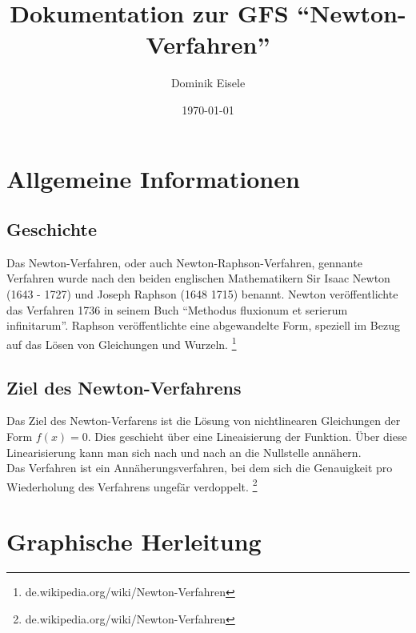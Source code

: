 \documentclass[a4paper,12pt,fleqn,oneside]{article}
\author{Dominik Eisele}
\title{Dokumentation zur GFS "`Newton-Verfahren"'}
\date{\today}
\begin{document}
\normalem

\begin{titlepage}
	\maketitle
\end{titlepage}

\tableofcontents

\newpage

\section{Allgemeine Informationen}
	\subsection{Geschichte}
		Das Newton-Verfahren, oder auch Newton-Raphson-Verfahren, gennante Verfahren wurde nach den beiden englischen Mathematikern Sir 
		Isaac Newton (1643 - 1727) und Joseph Raphson (1648 1715) benannt. Newton veröffentlichte das Verfahren 1736 in seinem Buch
		"`Methodus fluxionum et serierum infinitarum"'. Raphson veröffentlichte eine abgewandelte Form, speziell im Bezug auf das Lösen von
		Gleichungen und Wurzeln. \footnote{de.wikipedia.org/wiki/Newton-Verfahren}
		
	\subsection{Ziel des Newton-Verfahrens}
		Das Ziel des Newton-Verfarens ist die Lösung von nichtlinearen Gleichungen der Form $f(x) = 0$. Dies geschieht über eine Lineaisierung der
		Funktion. Über diese Linearisierung kann man sich nach und nach an die Nullstelle annähern.\\
		Das Verfahren ist ein Annäherungsverfahren, bei dem sich die Genauigkeit pro Wiederholung des Verfahrens ungefär verdoppelt.
		\footnote{de.wikipedia.org/wiki/Newton-Verfahren}
		
\newpage

\section{Graphische Herleitung}
	
\end{document}
